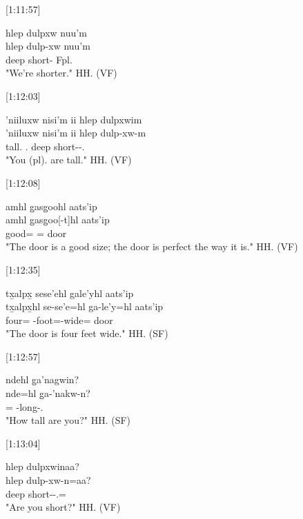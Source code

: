 [1:11:57]
\begin{exe}
    \ex \glll
    hlep dulpxw nuu'm \\
    hlep dulp-xw nuu'm \\
    deep short-\Val{} Fpl.\Iii \\
    \glt "We're shorter." \hfill HH.\ElicitationDate{} (VF)
\end{exe}

[1:12:03]
\begin{exe}
    \ex \glll
    ’niiluxw nisi'm ii hlep dulpxwim \\
    ’niiluxw nisi'm ii hlep dulp-xw-m \\
    tall.\Pl{} \Spl.\Iii \Ccnj{} deep short-\Val-\Fpl.\Ii{} \\
    \glt "You (pl). are tall." \hfill HH.\ElicitationDate{} (VF)
\end{exe}

[1:12:08]
\begin{exe}
    \ex \glll
    amhl g̱asg̱oohl aats'ip \\
    amhl g̱asg̱oo[-t]hl aats'ip \\
    good=\Cn{} \Mass[-3.\Ii]=\Cn{} door \\
    \glt "The door is a good size; the door is perfect the way it is." \hfill HH.\ElicitationDate{} (VF)
\end{exe}

[1:12:35]
\begin{exe}
    \ex \glll
    tx̱alpx̱ sese'ehl gale'yhl aats'ip \\
    tx̱alpx̱hl se-se'e=hl ga-le'y=hl aats'ip \\
    four=\Cn{} \Pl-foot=\Cn \Distr-wide=\Cn{} door \\
    \glt "The door is four feet wide." \hfill HH.\ElicitationDate{} (SF)
\end{exe}

[1:12:57]
\begin{exe}
    \ex \glll
    ndehl g̱a'nagwin? \\
    nde=hl g̱a-'nakw-n? \\
    \Wh=\Cn{} \Distr-long-\Ssg.\Ii \\
    \glt "How tall are you?" \hfill HH.\ElicitationDate{} (SF)
\end{exe}

[1:13:04]
\begin{exe}
    \ex \glll
    hlep dulpxwinaa? \\
    hlep dulp-xw-n=aa? \\
    deep short-\Val-\Ssg.\Ii=\Q \\
    \glt "Are you short?" \hfill HH.\ElicitationDate{} (VF)
\end{exe}

